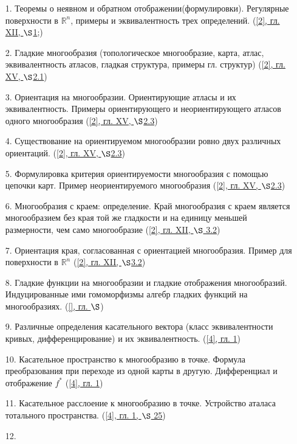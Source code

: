 \newpage
\begin{enumerate}
\item[1.] 
	Теоремы о неявном и обратном отображении(формулировки). Регулярные поверхности в $\mathbb{R}^n$, примеры и эквивалентность трех определений. (\href{Books/book2.pdf#page.165}{[2], гл. XII, $\S$1};)
\item[2.] 
	Гладкие многообразия (топологическое многообразие, карта, атлас, эквивалентность атласов, гладкая структура, примеры гл. структур) (\href{Books/book2#page.}{[2], гл. XV, $\S$2.1})
\item[3.] 
	Ориентация на многообразии. Ориентирующие атласы и их эквивалентность. Примеры ориентирующего и неориентирующего атласов одного многообразия (\href{Books/book2#page.}{[2], гл. XV, $\S$2.3})
\item[4.] 
	Существование на ориентируемом многообразии ровно двух различных ориентаций. (\href{Books/book2#page.}{[2], гл. XV, $\S$2.3})
\item[5.] 
	Формулировка критерия ориентируемости многообразия с помощью цепочки карт. Пример неориентируемого многообразия (\href{Books/book2#page.}{[2], гл. XV, $\S$2.3})
\item[6.] 
	Многообразия с краем: определение. Край многообразия с краем является многообразием без края той же гладкости и на единицу меньшей размерности, чем само многообразие (\href{Books/book2#page.}{[2], гл. XII, $\S$ 3.2})
\item[7.] 
	Ориентация края, согласованная с ориентацией многообразия. Пример для поверхности в $\mathbb{R}^n$ (\href{Books/book2#page.}{[2], гл. XII, $\S$3.2})
\item[8.] 
	Гладкие функции на многообразии и гладкие отображения многообразий. Индуцированные ими гомоморфизмы алгебр гладких функций на многообразиях. (\href{Books/book#page.}{[], гл. $\S$})
\item[9.] 
	Различные определения касательного вектора (класс эквивалентности кривых, дифференцирование) и их эквивалентность. (\href{Books/book4#page.}{[4], гл. 1})
\item[10.] 
	Касательное пространство к многообразию в точке. Формула преобразования при переходе из одной карты в другую. Дифференциал и отображение $f^*$ (\href{Books/book4#page.}{[4], гл. 1})
\item[11.] 
	Касательное расслоение к многообразию в точке. Устройство аталаса тотального пространства. (\href{Books/book4#page.}{[4], гл. 1, $\S$ 25})
\item[12.] 

\end{enumerate}
